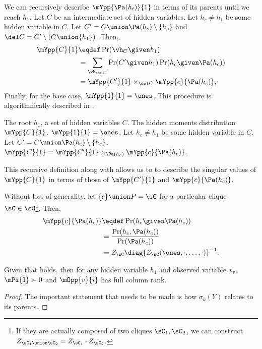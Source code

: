 We can recursively describe $\mYpp{ \Pa(h_t) }{1}$ in terms of its
  parents until we reach $h_1$.
Let $C$ be an intermediate set of hidden variables. Let $h_c \neq h_1$
  be some hidden variable in $C$. 
Let $C' = C \union \Pa(h_c) \setminus \{h_c\}$ and $\del C = C'
  \setminus (C \union \{h_1\})$.
Then,
\begin{align*}
  \mYpp{C}{1} &\eqdef \Pr( \vh_C \given h_1 )  \\
  &= \sum_{\vh_{\del C}} \Pr( C' \given h_1 ) \Pr( h_c \given \Pa(h_c) ) \\
  &= \mYpp{ C' }{ 1 } \times_{\del C} \mYpp{c}{\Pa(h_c)},
\end{align*}
Finally, for the base case, $\mYpp{1}{1} = \ones$.
This procedure is algorithmically described in .

\begin{algorithm}
  \caption{$\mYpp{C}{1}$}
  \label{algo:Y}
  \begin{algorithmic}
    \REQUIRE The root $h_1$, a set of hidden variables $C$.
    \ENSURE The hidden moments distribution $\mYpp{C}{1}$.
      \STATE $\mYpp{1}{1} = \ones$.
    \ELSE
      \STATE Let $h_c \neq h_1$ be some hidden variable in $C$.
      \STATE Let $C' = C \union \Pa(h_c) \setminus \{h_c\}$.
      \STATE $\mYpp{C}{1} = \mYpp{C'}{1} \times_{\Pa(h_c)} \mYpp{c}{\Pa(h_c)}$.
    \ENDIF
  \end{algorithmic}
\end{algorithm}

This recursive definition along with  allows us to to describe the
singular values of $\mYpp{C}{1}$ in terms of those of $\mYpp{C'}{1}$ and
$\mYpp{c}{\Pa(h_c)}$. 


Without loss of generality, let $\{c\} \union P = \sC$ for
a particular clique $\sC \in \sG$\footnote{If they are actually composed of two
cliques $\sC_1, \sC_2$, we can construct $Z_{\sC_1 \union \sC_2} = Z_{\sC_1} \cdot
Z_{\sC_2}$.}. Then, 
\begin{align*}
\mYpp{c}{\Pa(h_c)} 
  &\eqdef \Pr(h_c \given \Pa(h_c)) \\
  &= \frac{\Pr(h_c, \Pa(h_c))}{\Pr(\Pa(h_c))} \\
  &= Z_\sC \diag{Z_\sC(\ones, \cdot, \ldots, \cdot)}^{-1}.
\end{align*}

\begin{lemma}
  \label{lem:full-rank-suff}
  Given that  holds, then for any hidden
  variable $h_1$ and observed variable $x_v$, $\mPi{1} \succ 0$ and
  $\mOpp{v}{i}$ has full column rank.
\end{lemma}
\begin{proof}
  The important statement that needs to be made is how $\sigma_k(Y)$
  relates to its parents.
\end{proof}

